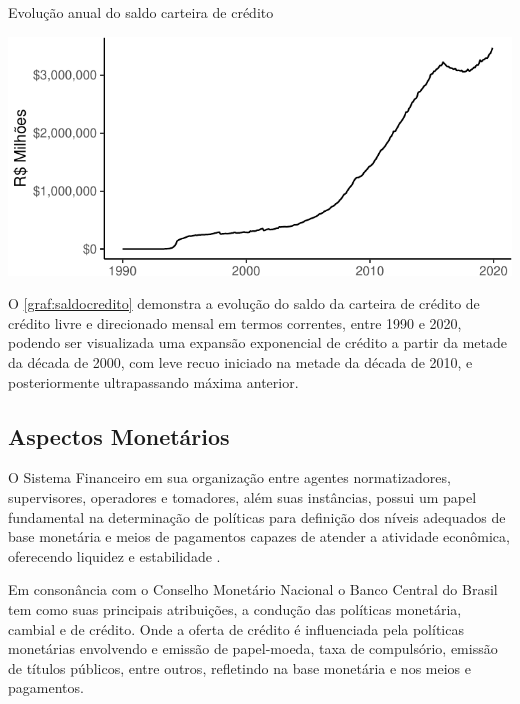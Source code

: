 \documentclass[
  12pt,
  12pt,
  openright,
  oneside,
  a4paper,
  chapter=TITLE,
  section=TITLE,
  subsection=TITLE,
  subsubsection=TITLE,
  english,
  portugues,
  sumario=tradicional]{abntex2}
\begin{document}
\begin{grafico}[!ht]
\vspace{20pt}
\caption{Evolução anual do saldo carteira de crédito}
\vspace{-4mm}

\begin{center}\includegraphics{12-exportedfigures/balance.credit-1} \end{center}
\vspace{-3mm}
\label{graf:saldocredito}
\vspace{-2mm}
\end{grafico}

O \autoref{graf:saldocredito} demonstra a evolução do saldo da carteira de crédito de crédito livre e direcionado mensal em termos correntes, entre 1990 e 2020, podendo ser visualizada uma expansão exponencial de crédito a partir da metade da década de 2000, com leve recuo iniciado na metade da década de 2010, e posteriormente ultrapassando máxima anterior.

\subsection{Aspectos Monetários}

O Sistema Financeiro em sua organização entre agentes normatizadores, supervisores, operadores e tomadores, além suas instâncias, possui um papel fundamental na determinação de políticas para definição dos níveis adequados de base monetária e meios de pagamentos capazes de atender a atividade econômica, oferecendo liquidez e estabilidade .

Em consonância com o Conselho Monetário Nacional o Banco Central do Brasil tem como suas principais atribuições, a condução das políticas monetária, cambial e de crédito. Onde a oferta de crédito é influenciada pela políticas monetárias envolvendo e emissão de papel-moeda, taxa de compulsório, emissão de títulos públicos, entre outros, refletindo na base monetária e nos meios e pagamentos.
\end{document}
